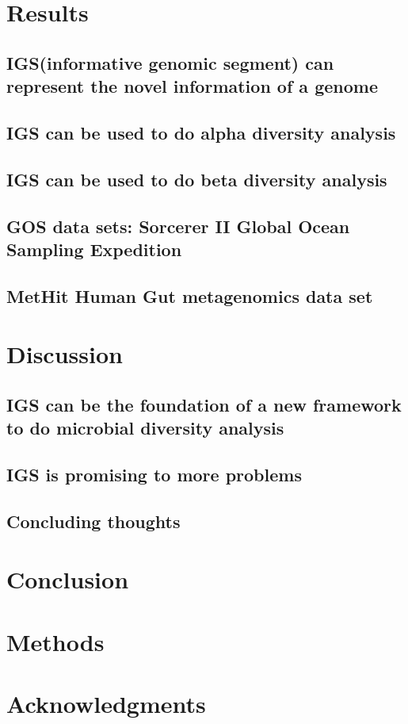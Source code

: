 \section{Results}

\subsection{IGS(informative genomic segment) can represent the novel information of a genome}



\subsection{IGS can be used to do alpha diversity analysis}



\subsection{IGS can be used to do beta diversity analysis}


\subsection{GOS data sets: Sorcerer II Global Ocean Sampling Expedition}



\subsection{MetHit Human Gut metagenomics data set}



\section{Discussion}

\subsection{IGS can be the foundation of a new framework to do microbial diversity analysis}


\subsection{IGS is promising to more problems}

\subsection{Concluding thoughts}



\section{Conclusion}

\section{Methods}

\section{Acknowledgments}



